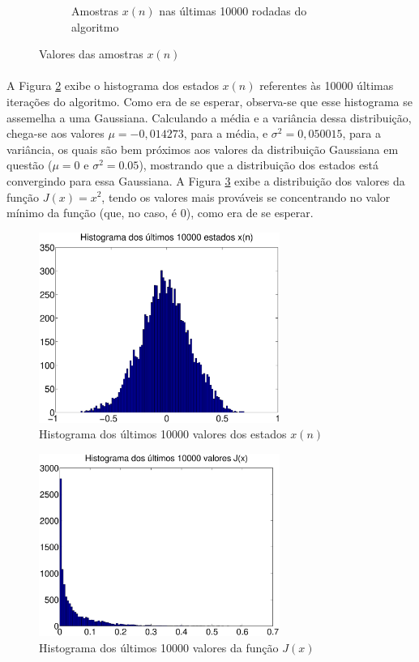 \documentclass{report}
\begin{document}
\begin{figure}[H]
\begin{subfigure}{0.4\textwidth}
		\caption{Amostras $x(n)$ nas últimas 10000 rodadas do algoritmo}
	\end{subfigure}
	\caption{Valores das amostras $x(n)$}
	\label{fig_estados_x}
\end{figure}

\paragraph{} A Figura \ref{fig_histograma_x} exibe o histograma dos estados $x(n)$ referentes às 10000 últimas iterações do algoritmo. Como era de se esperar, observa-se que esse histograma se assemelha a uma Gaussiana. Calculando a média e a variância dessa distribuição, chega-se aos valores $\mu = -0,014273$, para a média, e $\sigma^2 = 0,050015$, para a variância, os quais são bem próximos aos valores da distribuição Gaussiana em questão ($\mu = 0$ e $\sigma^2 = 0.05$), mostrando que a distribuição dos estados está convergindo para essa Gaussiana. A Figura \ref{fig_histograma_J} exibe a distribuição dos valores da função $J(x) = x^2$, tendo os valores mais prováveis se concentrando no valor mínimo da função (que, no caso, é 0), como era de se esperar.

\begin{figure}[H]
	\centering
	\includegraphics[width = 0.7\textwidth]{Q03_A_histograma_x.eps}
	\caption{Histograma dos últimos 10000 valores dos estados $x(n)$}
	\label{fig_histograma_x}
\end{figure} 

\begin{figure}[H]
	\centering
	\includegraphics[width = 0.7\textwidth]{Q03_A_histograma_J.eps}
	\caption{Histograma dos últimos 10000 valores da função $J(x)$}
	\label{fig_histograma_J}
\end{figure}
\end{document}
